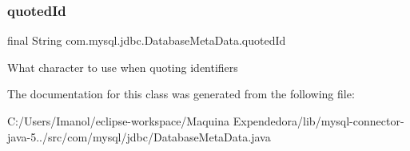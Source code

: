 \subsubsection{\texorpdfstring{quoted\+Id}{quotedId}}
{\footnotesize\ttfamily final String com.\+mysql.\+jdbc.\+Database\+Meta\+Data.\+quoted\+Id\hspace{0.3cm}{\ttfamily [protected]}}

What character to use when quoting identifiers 

The documentation for this class was generated from the following file\+:\begin{DoxyCompactItemize}
\item 
C\+:/\+Users/\+Imanol/eclipse-\/workspace/\+Maquina Expendedora/lib/mysql-\/connector-\/java-\/5../src/com/mysql/jdbc/Database\+Meta\+Data.\+java\end{DoxyCompactItemize}
